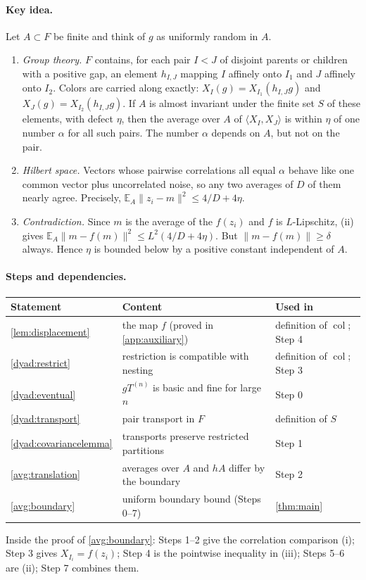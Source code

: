 \documentclass[11pt]{article}
\newcommand{\norm}[1]{\lVert #1\rVert}
\newcommand{\ip}[2]{\langle #1,#2\rangle}
\DeclareMathOperator{\colr}{col}
\theoremstyle{definition}
\numberwithin{equation}{section}
\begin{document}
\paragraph{Key idea.}
Let \(A\subset F\) be finite and think of \(g\) as uniformly random in \(A\).
\begin{enumerate}[label=(\roman*)]
\item \emph{Group theory.} \(F\) contains, for each pair \(I<J\) of disjoint
parents or children with a positive gap, an element \(h_{I,J}\) mapping \(I\)
affinely onto \(I_1\) and \(J\) affinely onto \(I_2\). Colors are carried
along exactly: \(X_I(g)=X_{I_1}(h_{I,J}g)\) and \(X_J(g)=X_{I_2}(h_{I,J}g)\).
If \(A\) is almost invariant under the finite set \(S\) of these elements,
with defect \(\eta\), then the average over \(A\) of \(\ip{X_I}{X_J}\) is
within \(\eta\) of one number \(\alpha\) for all such pairs. The number
\(\alpha\) depends on \(A\), but not on the pair.
\item \emph{Hilbert space.} Vectors whose pairwise correlations all equal
\(\alpha\) behave like one common vector plus uncorrelated noise, so any two
averages of \(D\) of them nearly agree. Precisely,
\(\mathbb E_A\norm{z_i-m}^2\le 4/D+4\eta\).
\item \emph{Contradiction.} Since \(m\) is the average of the \(f(z_i)\) and
\(f\) is \(L\)-Lipschitz, (ii) gives
\(\mathbb E_A\norm{m-f(m)}^2\le L^2(4/D+4\eta)\). But
\(\norm{m-f(m)}\ge\delta\) always. Hence \(\eta\) is bounded below by a
positive constant independent of \(A\).
\end{enumerate}

\paragraph{Steps and dependencies.}
\begin{center}
\begin{tabular}{@{}lll@{}}
\toprule
Statement & Content & Used in\\
\midrule
\cref{lem:displacement} & the map \(f\) (proved in \cref{app:auxiliary}) &
   definition of \(\colr\); Step 4\\
\cref{dyad:restrict} & restriction is compatible with nesting &
   definition of \(\colr\); Step 3\\
\cref{dyad:eventual} & \(gT^{(n)}\) is basic and fine for large \(n\) & Step 0\\
\cref{dyad:transport} & pair transport in \(F\) & definition of \(S\)\\
\cref{dyad:covariancelemma} & transports preserve restricted partitions & Step 1\\
\cref{avg:translation} & averages over \(A\) and \(hA\) differ by the boundary & Step 2\\
\cref{avg:boundary} & uniform boundary bound (Steps 0--7) & \cref{thm:main}\\
\bottomrule
\end{tabular}
\end{center}
Inside the proof of \cref{avg:boundary}: Steps 1--2 give the correlation
comparison (i); Step 3 gives \(X_{I_i}=f(z_i)\); Step 4 is the pointwise
inequality in (iii); Steps 5--6 are (ii); Step 7 combines them.
\end{document}
